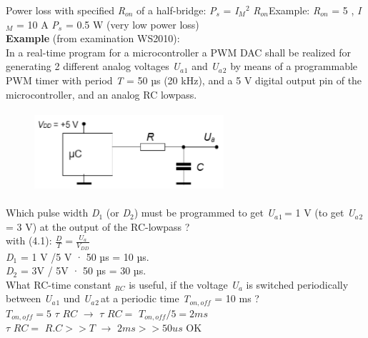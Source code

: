 Power loss with specified \textit{R${}_{on}$} of a half-bridge:     \textit{P${}_{s}$ }= \textit{I${}_{M}$}${}^{2}$ \textit{R${}_{on}$}Example: \textit{R${}_{on}$} = 5 , \textit{I${}_{M}$} = 10 A  \textit{P${}_{s}$} = 0.5 W    (very low power loss)\\

\textbf{Example} (from examination WS2010):\\

In a real-time program for a microcontroller a PWM DAC shall be realized for generating 2 different analog voltages \textit{U${}_{a}$}${}_{1}$ and \textit{U${}_{a}$}${}_{2}$ by means of a programmable PWM timer with period \textit{T} = 50 µs (20 kHz), and a 5 V digital output pin of the microcontroller, and an analog RC lowpass.

    \begin{figure}[h]
    \centering
    \includegraphics[width=7cm, height=3cm]{Images/image172.png}
    \label{fig:Fig 126}
    \end{figure}

Which pulse width \textit{D}${}_{1}$ (or \textit{D}${}_{2}$) must be programmed to get \textit{U${}_{a}$}${}_{1\ }$= 1 V (to get \textit{U${}_{a}$}${}_{2\ }$= 3 V) at the output of the RC-lowpass ?\\

with (4.1):  \textit{$\frac{D}{T} =\frac{U_{a} }{V_{DD} } $}  \\

\textit{D}${}_{1}$ = 1 V /5 V · 50 µs = 10 µs.  \\
\textit{D}${}_{2}$ = 3V / 5V · 50 µs = 30 µs.  \\  

What RC-time constant \textit{${}_{RC}$} is useful, if the voltage \textit{U${}_{a}$} is switched periodically between \textit{U${}_{a}$}${}_{1}$ und \textit{U${}_{a}$}${}_{2\ }$at a periodic time \textit{T${}_{on,off}$}  = 10 ms ? \\ 

$T_{on,off}=5$ $\tau$ $RC$ \hspace{1cm} $\rightarrow$ $\tau$ $RC=$  $T_{on,off}/5=2ms$ \\
$\tau$ $RC=$ $R.C >>T$ \hspace{0.80cm} $\rightarrow$ $2ms >> 50 us$ OK\\

